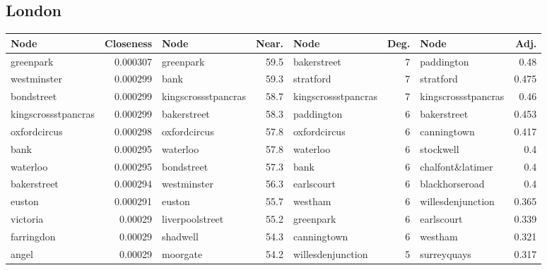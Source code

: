 \subsection*{London}
\begin{adjustwidth}{-1.3in}{-1.3in}\begin{center}
\begin{tabular}{lrlrlrlr}
\hline
 Node                &   Closeness & Node                &   Near. & Node                &   Deg. & Node                &   Adj. \\
\hline
 greenpark           &    0.000307 & greenpark           &    59.5 & bakerstreet         &      7 & paddington          &  0.48  \\
 westminster         &    0.000299 & bank                &    59.3 & stratford           &      7 & stratford           &  0.475 \\
 bondstreet          &    0.000299 & kingscrossstpancras &    58.7 & kingscrossstpancras &      7 & kingscrossstpancras &  0.46  \\
 kingscrossstpancras &    0.000299 & bakerstreet         &    58.3 & paddington          &      6 & bakerstreet         &  0.453 \\
 oxfordcircus        &    0.000298 & oxfordcircus        &    57.8 & oxfordcircus        &      6 & canningtown         &  0.417 \\
 bank                &    0.000295 & waterloo            &    57.8 & waterloo            &      6 & stockwell           &  0.4   \\
 waterloo            &    0.000295 & bondstreet          &    57.3 & bank                &      6 & chalfont\&latimer    &  0.4   \\
 bakerstreet         &    0.000294 & westminster         &    56.3 & earlscourt          &      6 & blackhorseroad      &  0.4   \\
 euston              &    0.000291 & euston              &    55.7 & westham             &      6 & willesdenjunction   &  0.365 \\
 victoria            &    0.00029  & liverpoolstreet     &    55.2 & greenpark           &      6 & earlscourt          &  0.339 \\
 farringdon          &    0.00029  & shadwell            &    54.3 & canningtown         &      6 & westham             &  0.321 \\
 angel               &    0.00029  & moorgate            &    54.2 & willesdenjunction   &      5 & surreyquays         &  0.317 \\

\end{tabular}
\end{center}
\end{adjustwidth}
